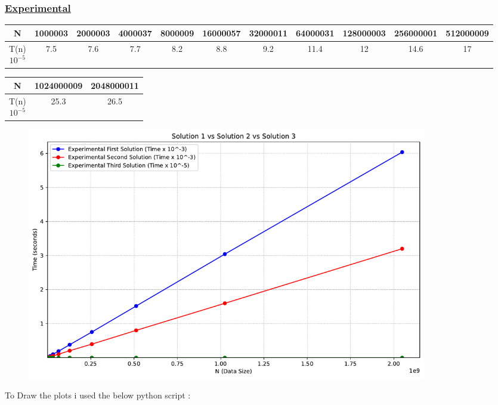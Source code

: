 

\subsubsection*{\underline{Experimental}}

\begin{tabular}{|c|c|c|c|c|c|c|c|c|c|c|}
\hline
N & 1000003 & 2000003 & 4000037 & 8000009 & 16000057 & 32000011 & 64000031 & 128000003 & 256000001 & 512000009 \\
\hline
\makecell{T(n)\\\(10^{-5}\)} & 7.5 & 7.6 & 7.7 & 8.2 & 8.8 & 9.2 & 11.4 & 12 & 14.6 & 17\\
\hline
\end{tabular}

\vspace{0.25cm}

\begin{tabular}{|c|c|c|}
    \hline
    N & 1024000009 & 2048000011\\
    \hline
    \makecell{T(n)\\\(10^{-5}\)}  & 25.3 & 26.5\\
    \hline
\end{tabular}

\vspace{0.5cm}

\begin{figure}[h!]
    \centering
    \includegraphics[width=0.85\textwidth]{Questions/Part3/plot.pdf}
    \label{fig:time_plot}
\end{figure}

\newpage

To Draw the plots i used the below python script :

\vspace{1cm}

